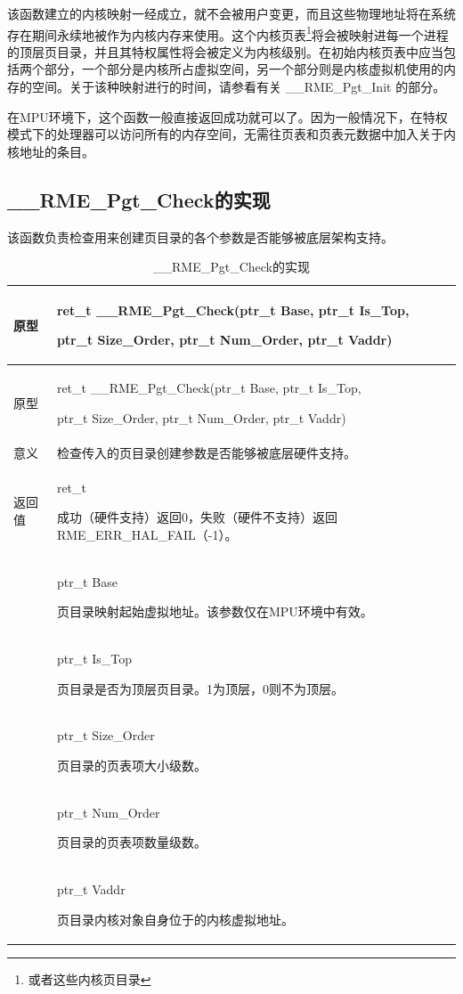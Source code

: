 该函数建立的内核映射一经成立，就不会被用户变更，而且这些物理地址将在系统存在期间永续地被作为内核内存来使用。这个内核页表\footnote{或者这些内核页目录}将会被映射进每一个进程的顶层页目录，并且其特权属性将会被定义为内核级别。在初始内核页表中应当包括两个部分，一个部分是内核所占虚拟空间，另一个部分则是内核虚拟机使用的内存的空间。关于该种映射进行的时间，请参看有关 \_\_RME\_Pgt\_Init 的部分。

在MPU环境下，这个函数一般直接返回成功就可以了。因为一般情况下，在特权模式下的处理器可以访问所有的内存空间，无需往页表和页表元数据中加入关于内核地址的条目。

\subsection{\_\_RME\_Pgt\_Check的实现}\label{subsec:7-rme-pgt-check-implementation}

该函数负责检查用来创建页目录的各个参数是否能够被底层架构支持。

\begin{xltabular}{\textwidth}{@{}>{\hsize\raggedright\arraybackslash}X>{\hsize\raggedright\arraybackslash}X@{}}
\caption{\_\_RME\_Pgt\_Check的实现}\label{tab:7-76-rme-pgt-check-implementation}\\
\toprule
原型\strut
 & ret\_t \_\_RME\_Pgt\_Check(ptr\_t Base, ptr\_t Is\_Top,

ptr\_t Size\_Order, ptr\_t Num\_Order, ptr\_t Vaddr)\strut
\tabularnewline
\endfirsthead
\toprule
原型\strut
 & ret\_t \_\_RME\_Pgt\_Check(ptr\_t Base, ptr\_t Is\_Top,

ptr\_t Size\_Order, ptr\_t Num\_Order, ptr\_t Vaddr)\strut
\tabularnewline
\midrule
\endhead
\bottomrule
\endlastfoot
意义 & 检查传入的页目录创建参数是否能够被底层硬件支持。\tabularnewline
返回值\strut
 & ret\_t

成功（硬件支持）返回0，失败（硬件不支持）返回 RME\_ERR\_HAL\_FAIL（-1）。\strut
\tabularnewline
{} & ptr\_t Base

页目录映射起始虚拟地址。该参数仅在MPU环境中有效。\strut
\tabularnewline
\strut
 & ptr\_t Is\_Top

页目录是否为顶层页目录。1为顶层，0则不为顶层。\strut
\tabularnewline
\strut
 & ptr\_t Size\_Order

页目录的页表项大小级数。\strut
\tabularnewline
\strut
 & ptr\_t Num\_Order

页目录的页表项数量级数。\strut
\tabularnewline
\strut
 & ptr\_t Vaddr

页目录内核对象自身位于的内核虚拟地址。\strut
\tabularnewline
\end{xltabular}

